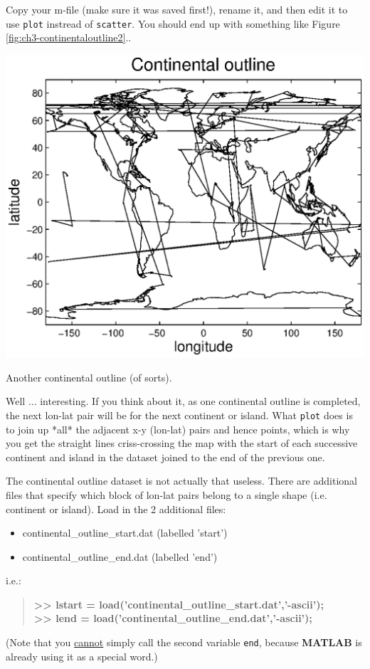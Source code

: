 \documentclass{tufte-book} %
\newenvironment{docspecbold}{\begin{quotation}\ttfamily\bfseries\parskip0pt\parindent0pt\ignorespaces}{\end{quotation}}
\begin{document}
Copy your m-file (make sure it was saved first!), rename it, and then edit it to use \texttt{plot} instread of \texttt{scatter}. You should end up with something like Figure \ref{fig:ch3-continentaloutline2}.. 
\begin{marginfigure}[0.0in]
\includegraphics[width=\linewidth]{ch3-continentaloutline2.eps}
\caption{Another continental outline (of sorts).}
\label{fig:ch3-continentaloutline2}
\end{marginfigure}

Well ... interesting. If you think about it, as one continental outline is completed, the next lon-lat pair will be for the next continent or island. What \texttt{plot} does is to join up *all* the adjacent x-y (lon-lat) pairs and hence points, which is why you get the straight lines criss-crossing the map with  the start of each successive continent and island in the dataset joined to the end of the previous one.

The continental outline dataset is not actually that useless. There are  additional files that specify which block of lon-lat pairs belong to a single shape (i.e. continent or island). Load in the 2 additional files:
\begin{itemize}[noitemsep]
\setlength{\itemindent}{.2in}
\item \textsf{continental\_outline\_start.dat} (labelled '\textsf{start}')
\item \textsf{continental\_outline\_end.dat} (labelled '\textsf{end}')
\end{itemize}
i.e.:
\begin{docspecbold}
>> lstart = load('continental\_outline\_start.dat','-ascii');
\\>> lend = load('continental\_outline\_end.dat','-ascii');
\end{docspecbold}
(Note that you \uline{cannot} simply call the second variable \texttt{end}, because \textbf{MATLAB} is already using it as a special word.)
\end{document}
